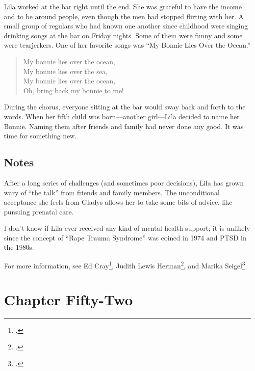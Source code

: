 \documentclass[
  letterpaper,
]{book}
\begin{document}
Lila worked at the bar right until the end. She was grateful to have the
income and to be around people, even though the men had stopped flirting
with her. A small group of regulars who had known one another since
childhood were singing drinking songs at the bar on Friday nights. Some
of them were funny and some were tearjerkers. One of her favorite songs
was ``My Bonnie Lies Over the Ocean.''

\begin{quote}
My bonnie lies over the ocean,\\
My bonnie lies over the sea,\\
My bonnie lies over the ocean,\\
Oh, bring back my bonnie to me!
\end{quote}

During the chorus, everyone sitting at the bar would sway back and forth
to the words. When her fifth child was born---another girl---Lila
decided to name her Bonnie. Naming them after friends and family had
never done any good. It was time for something new.

\section{Notes}\label{notes-53}

After a long series of challenges (and sometimes poor decisions), Lila
has grown wary of ``the talk'' from friends and family members. The
unconditional acceptance she feels from Gladys allows her to take some
bits of advice, like pursuing prenatal care.

I don't know if Lila ever received any kind of mental health support; it
is unlikely since the concept of ``Rape Trauma Syndrome'' was coined in
1974 and PTSD in the 1980s.

For more information, see Ed Cray\footnote{.}, Judith Lewis Herman\footnote{.}, and Marika
Seigel\footnote{.}.


\chapter{Chapter Fifty-Two}\label{chapter-fifty-two}
\end{document}
